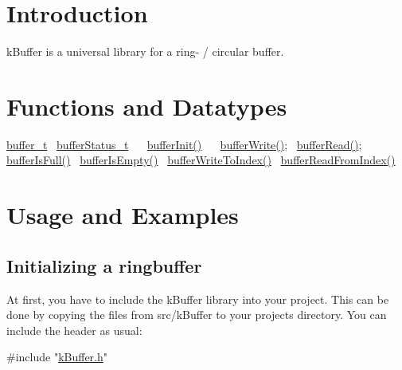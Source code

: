 \hypertarget{index_intro}{}\section{Introduction}\label{index_intro}
k\+Buffer is a universal library for a ring-\/ / circular buffer. \hypertarget{index_function}{}\section{Functions and Datatypes}\label{index_function}
\hyperlink{structbuffer__t}{buffer\+\_\+t}~\newline
 \hyperlink{k_buffer_8h_a7a0bf550b7bd49d85172e409c0034fe6}{buffer\+Status\+\_\+t}~\newline
 ~\newline
 \hyperlink{k_buffer_8c_aec18d6ea571b1326dbeb7ca15f4969c0}{buffer\+Init()}~\newline
 ~\newline
 \hyperlink{k_buffer_8c_a9d6410a89adf65a3ef12340ecb9bbd55}{buffer\+Write()};~\newline
 \hyperlink{k_buffer_8c_a9b80be9033ccd6b5a101f811520ab4cc}{buffer\+Read()};~\newline
 ~\newline
 \hyperlink{k_buffer_8c_ac69b8a12a33d0cf0a5dab8feb4f7b020}{buffer\+Is\+Full()}~\newline
 \hyperlink{k_buffer_8c_a5c599b9386c73ccd7b5eeb25f6cca38e}{buffer\+Is\+Empty()}~\newline
 \hyperlink{k_buffer_8c_a8508583be1e356a243b0ce67254c516e}{buffer\+Write\+To\+Index()}~\newline
 \hyperlink{k_buffer_8c_aa0d7e2a4b6fd3da2822d7f968be74e5c}{buffer\+Read\+From\+Index()}~\newline
 \hypertarget{index_usage}{}\section{Usage and Examples}\label{index_usage}
\hypertarget{index_init}{}\subsection{Initializing a ringbuffer}\label{index_init}
At first, you have to include the k\+Buffer library into your project. This can be done by copying the files from src/k\+Buffer to your project\textquotesingle{}s directory. You can include the header as usual\+: 
\begin{DoxyCode}
\textcolor{preprocessor}{#include "\hyperlink{k_buffer_8h}{kBuffer.h}"}
\end{DoxyCode}
